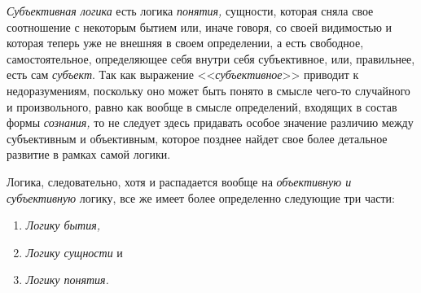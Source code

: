 {\em Субъективная логика} есть логика
{\em понятия,} сущности, которая сняла свое соотношение
с некоторым бытием или, иначе говоря, со своей видимостью и которая теперь
уже не внешняя в своем определении, а есть свободное, самостоятельное,
определяющее себя внутри себя субъективное, или, правильнее, есть сам
{\em субъект}. Так как выражение
<<{\em субъективное}>> приводит к недоразумениям,
поскольку оно может быть понято в смысле чего-то случайного и
произвольного, равно как вообще в смысле определений, входящих в состав
формы {\em сознания,} то не следует здесь придавать
особое значение различию между субъективным и объективным, которое позднее
найдет свое более детальное развитие в рамках самой логики.

Логика, следовательно, хотя и распадается вообще на
{\em объективную и субъективную} логику, все же имеет
более определенно следующие три части:
\begin{enumerate}[~~~~I.]
\item{\em Логику бытия,}
\item{\em Логику сущности} и
\item{\em Логику понятия.}
\end{enumerate}

\bigskip
